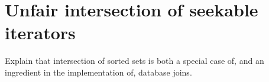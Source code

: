\documentclass[acmsmall,screen,review,anonymous,dvipsnames,svgnames]{acmart}
\newcommand\todo[1]{{\color{Orange}#1}}
\begin{document}











\section{Unfair intersection of seekable iterators}

\todo{Explain that intersection of sorted sets is both a special case of, and an ingredient in the implementation of, database joins.}
\end{document}
